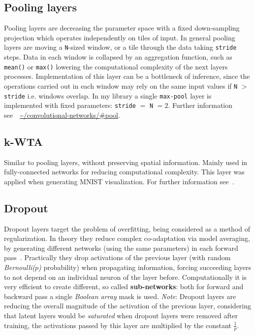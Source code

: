 \subsection{Pooling layers} Pooling layers are decreasing the parameter space with a fixed down-sampling projection which operates independently on tiles of input.
In general pooling layers are moving a \texttt{N}-sized window, or a tile through the data taking \texttt{stride} steps.
Data in each window is collapsed by an aggregation function, such as \texttt{mean()} or \texttt{max()} lowering the computational complexity of the next layers processes. Implementation of this layer can be a bottleneck of inference, since the operations carried out in each window may rely on the same input values if \texttt{N} $>$ \texttt{stride} i.e. windows overlap. In my library a single \texttt{max-pool} layer is implemented with fixed parameters: \texttt{stride} $=$ \texttt{N} $=2$. Further information see~\cite{stanfordlectures}~\url{~/convolutional-networks/#pool}.

\subsection{k-WTA}
Similar to pooling layers, without preserving spatial information.
Mainly used in fully-connected networks for reducing computational complexity.
This layer was applied when generating MNIST visualization.
For further information see~\cite{wta}.

\subsection{Dropout} Dropout layers target the problem of overfitting, being considered as a method of regularization.
In theory they reduce complex co-adaptation via model averaging, 
by generating different networks (using the same parameters) in each forward pass~\cite{hinton2012improving}.
Practically they drop activations of the previous layer (with random \emph{Bernoulli($p$)} probability) when propagating information, forcing succeeding layers to not depend on an individual neuron of the layer before.  
Computationally it is very efficient to create different, so called \textbf{sub-networks}: both for forward and backward pass a single \emph{Boolean array} mask is used.
\emph{Note}: Dropout layers are reducing the overall magnitude of the activation of the previous layer,
considering that latent layers would be \emph{saturated} when dropout layers were removed after training,
the activations passed by this layer are multiplied by the constant $\frac{1}{p}$.
